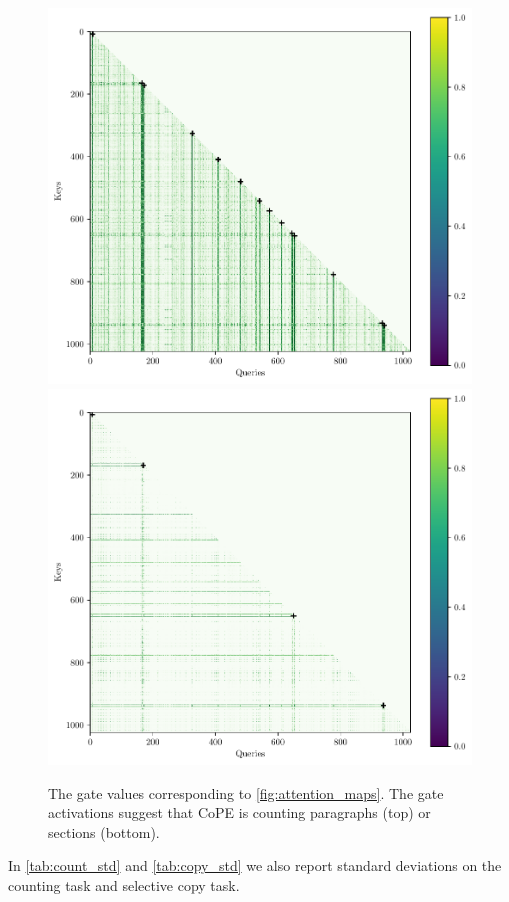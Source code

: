 \documentclass{article}
\newcommand{\ours}{CoPE\xspace}
\begin{document}
\begin{figure}[h]
    \centering
    \includegraphics[width=0.8\linewidth]{figs/gates_lay1_head9.pdf}
    \includegraphics[width=0.8\linewidth]{figs/gates_lay1_head0.pdf}
    \caption{The gate values corresponding to \cref{fig:attention_maps}. The gate activations suggest that \ours{} is counting paragraphs (top) or sections (bottom).}
    \label{fig:gates}
\end{figure}

In \cref{tab:count_std} and \cref{tab:copy_std} we also report standard deviations on the counting task and selective copy task.
\end{document}
